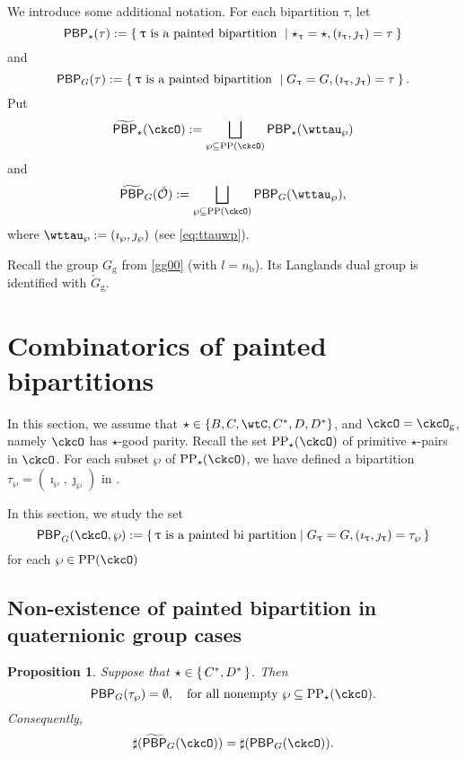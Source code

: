 \documentclass[12pt,a4paper]{amsart}
\def\subset{\subseteq}
\newcommand{\CO}{{\mathcal {O}}}
\numberwithin{equation}{section}
\newtheorem{prop}[thm]{Proposition}
\theoremstyle{remark}
\def\LC{{}^{\scriptscriptstyle L}\sC}
\def\CPP{\mathrm{PP}}
\def\CPPs{\mathrm{PP}_{\star}}
\def\tPBP{\widetilde{\mathsf{PBP}}}
\def\PBP{\mathsf{PBP}}
\def\ckcOg{\ckcO_{\mathrm g}}
\def\nnb{n_{\mathrm b}}
\def\tPBP{\widetilde{\mathsf{PBP}}}
\def\PBPop#1#2#3#4{\PBP_{#1}^{#2}(#3,#4)}
\def\PBPGOP{\PBPop{G}{}{\ckcO}{\wp}}
\begin{document}
 
 We introduce some additional notation. For each bipartition $\tau$, let
\[
  \PBP_{\star}(\tau) := \Set{ \uptau \text{ is a painted bipartition }\mid  \star_{\uptau}=\star, (\imath_{\uptau},\jmath_{\uptau}) = \tau}
\]
and
\[
  \PBP_{G}(\tau) := \Set{\uptau \text{ is a painted bipartition }\mid G_{\uptau}=G, (\imath_{\uptau},\jmath_{\uptau}) = \tau}.
\]
Put
\[
  \tPBP_{\star}(\ckcO) := %
  \bigsqcup_{\wp \subseteq \CPP(\ckcO)}\PBP_{\star}(\wttau_{\wp})
\]
and
\[
  \tPBP_{G}(\check \CO):=   \bigsqcup_{\wp \subseteq \CPP(\ckcO)}\PBP_{G}(\wttau_{\wp}),
 \] 
where $\wttau_{\wp} := (\imath_{\wp},\jmath_{\wp})$ (see \eqref{eq:ttauwp}). 


Recall the group $G_\mathrm g$ from \eqref{gg00} (with $l=\nnb$).  Its Langlands dual group is identified with $\check G_\mathrm g$. 




\section{Combinatorics of painted bipartitions}


In this section, we assume that $\star \in \{B,C,\wtC,C^{*},D,D^{*}\}$, and $\ckcO = \ckcOg$, namely $\ckcO $ has $\star$-good parity.
Recall the set  $\CPPs(\ckcO)$ of primitive $\star$-pairs in $\ckcO$. For each subset $\wp$ of $\CPPs(\ckcO)$, we have defined a bipartition $\tau_{\wp}=(\imath_{\wp},\jmath_{\wp})$ in .

In this section, we study the set
\[
\PBPGOP := \set{\uptau \text{ is a painted bi
    partition}| G_{\uptau}=G,  (\imath_{\uptau},\jmath_{\uptau}) = \tau_{\wp}}
\]
for each $\wp\in \CPP(\ckcO)$


%
\subsection{Non-existence of painted bipartition in quaternionic group cases}
\begin{prop} \label{prop:PBP1} Suppose that $\star\in \set{C^{*}, D^{*}}$. Then
\[
    \PBP_{G}(\tau_{\wp}) = \emptyset, \quad \text{for all nonempty $\wp\subset \CPPs(\ckcO)$.}
  \]
 Consequently,
     \[
     \sharp(\tPBP_{G}(\ckcO)) = \sharp(\PBP_{G}(\ckcO)).
  \]
\end{prop}
\end{document}
